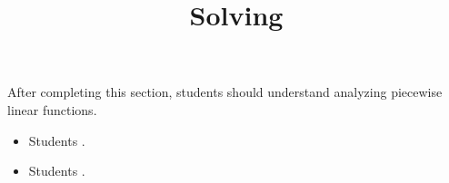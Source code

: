 \documentclass{ximera}
\title{Solving}
\begin{document}
\begin{abstract}
\end{abstract}

\maketitle

\begin{sectionOutcomes}

After completing this section, students should understand analyzing piecewise linear functions. 

\begin{itemize}
\item Students .
\item Students .
\end{itemize}

\end{sectionOutcomes}
\end{document}
